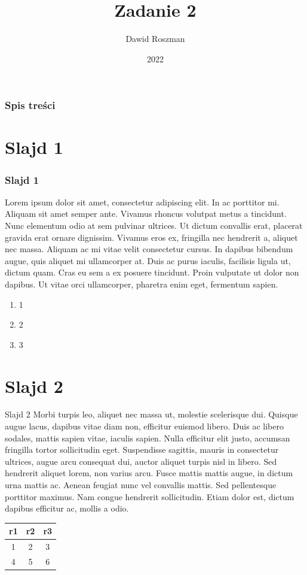 \documentclass{beamer}
\title{Zadanie 2}
\author{Dawid Roszman}
\institute{UG}
\date{2022}
\begin{document}
	
	\frame{\titlepage}
	\begin{frame}
		\frametitle{Spis treści}
		\tableofcontents
	\end{frame}

\section{Slajd 1}
	\begin{frame}
		\frametitle{Slajd 1}
		Lorem ipsum dolor sit amet, consectetur adipiscing elit. In ac porttitor mi. Aliquam sit amet semper ante. Vivamus rhoncus volutpat metus a tincidunt. Nunc elementum odio at sem pulvinar ultrices. Ut dictum convallis erat, placerat gravida erat ornare dignissim. Vivamus eros ex, fringilla nec hendrerit a, aliquet nec massa. Aliquam ac mi vitae velit consectetur cursus. In dapibus bibendum augue, quis aliquet mi ullamcorper at. Duis ac purus iaculis, facilisis ligula ut, dictum quam. Cras eu sem a ex posuere tincidunt. Proin vulputate ut dolor non dapibus. Ut vitae orci ullamcorper, pharetra enim eget, fermentum sapien.
		\begin{enumerate}
			\item 1
			\item 2
			\item 3
		\end{enumerate}
	\end{frame}

\section{Slajd 2}
	\begin{frame}{Slajd 2}
		Morbi turpis leo, aliquet nec massa ut, molestie scelerisque dui. Quisque augue lacus, dapibus vitae diam non, efficitur euismod libero. Duis ac libero sodales, mattis sapien vitae, iaculis sapien. Nulla efficitur elit justo, accumsan fringilla tortor sollicitudin eget. Suspendisse sagittis, mauris in consectetur ultrices, augue arcu consequat dui, auctor aliquet turpis nisl in libero. Sed hendrerit aliquet lorem, non varius arcu. Fusce mattis mattis augue, in dictum urna mattis ac. Aenean feugiat nunc vel convallis mattis. Sed pellentesque porttitor maximus. Nam congue hendrerit sollicitudin. Etiam dolor est, dictum dapibus efficitur ac, mollis a odio.
		\begin{table}
			\hfill
		\begin{tabular}{|c||c||c|}
			\hline
			r1 & r2 & r3 \\ 
			\hline
			1 & 2 & 3\\ 
			\hline
			4 & 5 & 6\\ 
			\hline
		\end{tabular}
		\end{table}
	\end{frame}
\end{document}
